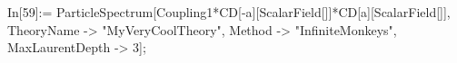 In[59]:= ParticleSpectrum[Coupling1*CD[-a][ScalarField[]]*CD[a][ScalarField[]], TheoryName -> "MyVeryCoolTheory", Method -> "InfiniteMonkeys", MaxLaurentDepth -> 3]; 